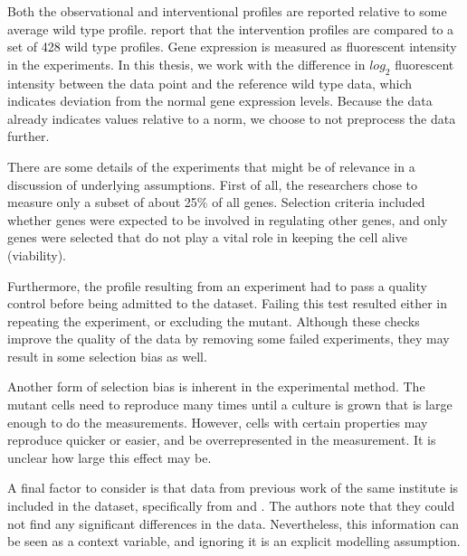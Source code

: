 Both the observational and interventional profiles are reported relative to some average wild type profile. \citet{kemmeren2014large} report that the intervention profiles are compared to a set of 428 wild type profiles. Gene expression is measured as fluorescent intensity in the experiments. In this thesis, we work with the difference in $log_2$ fluorescent intensity between the data point and the reference wild type data, which indicates deviation from the normal gene expression levels. Because the data already indicates values relative to a norm, we choose to not preprocess the data further.


There are some details of the experiments that might be of relevance in a discussion of underlying assumptions. First of all, the researchers chose to measure only a subset of about 25\% of all genes. Selection criteria included whether genes were expected to be involved in regulating other genes, and only genes were selected that do not play a vital role in keeping the cell alive (viability). 

Furthermore, the profile resulting from an experiment had to pass a quality control before being admitted to the dataset. Failing this test resulted either in repeating the experiment, or excluding the mutant. Although these checks improve the quality of the data by removing some failed experiments, they may result in some selection bias as well. 

Another form of selection bias is inherent in the experimental method. The mutant cells need to reproduce many times until a culture is grown that is large enough to do the measurements. However, cells with certain properties may reproduce quicker or easier, and be overrepresented in the measurement. It is unclear how large this effect may be.

A final factor to consider is that  data from previous work of the same institute is included in the dataset, specifically from \citet{lenstra2011specificity} and \citet{van2010functional}. The authors note that they could not find any significant differences in the data. Nevertheless, this information can be seen as a context variable, and ignoring it is an explicit modelling assumption.

